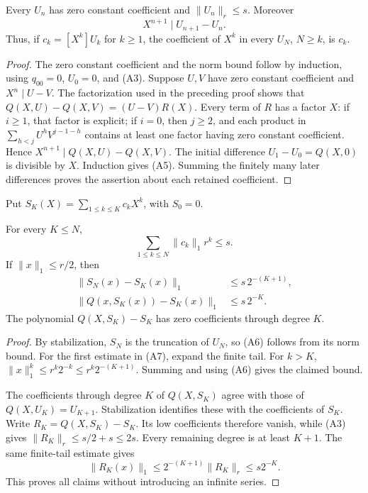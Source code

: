 \begin{lemma}
\label{lem:branch-stabilization}
Every \(U_n\) has zero constant coefficient and
\(\lVert U_n\rVert_r\leq s\). Moreover
\[
  X^{n+1}\mid U_{n+1}-U_n.
 \tag{A5}\label{eq:degree-stabilization}
\]
Thus, if \(c_k=[X^k]U_k\) for \(k\geq1\), the coefficient of
\(X^k\) in every \(U_N\), \(N\geq k\), is \(c_k\).
\end{lemma}
\begin{proof}
The zero constant coefficient and the norm bound follow by induction,
using \(q_{00}=0\), \(U_0=0\), and (A3). Suppose \(U,V\) have zero
constant coefficient and \(X^n\mid U-V\). The factorization used in
the preceding proof shows that
\(Q(X,U)-Q(X,V)=(U-V)R(X)\). Every term of \(R\) has a factor
\(X\): if \(i\geq1\), that factor is explicit; if \(i=0\), then
\(j\geq2\), and each product in
\(\sum_{h<j}U^hV^{j-1-h}\) contains at least one factor having zero
constant coefficient. Hence \(X^{n+1}\mid Q(X,U)-Q(X,V)\).
The initial difference \(U_1-U_0=Q(X,0)\) is divisible by \(X\).
Induction gives (A5). Summing the finitely many later differences
proves the assertion about each retained coefficient.
\end{proof}

Put \(S_K(X)=\sum_{1\leq k\leq K}c_kX^k\), with \(S_0=0\).

\begin{theorem}
\label{thm:finite-branch}
For every \(K\leq N\),
\[
 \sum_{1\leq k\leq N}\lVert c_k\rVert_1r^k\leq s.
 \tag{A6}\label{eq:branch-majorant}
\]
If \(\lVert x\rVert_1\leq r/2\), then
\[
 \begin{split}
 \lVert S_N(x)-S_K(x)\rVert_1&\leq s\,2^{-(K+1)},\\
 \lVert Q(x,S_K(x))-S_K(x)\rVert_1&\leq s\,2^{-K}.
 \end{split}
 \tag{A7}\label{eq:branch-tail}
\]
The polynomial \(Q(X,S_K)-S_K\) has zero coefficients through
degree \(K\).
\end{theorem}
\begin{proof}
By stabilization, \(S_N\) is the truncation of \(U_N\), so (A6)
follows from its norm bound. For the first estimate in (A7), expand the
finite tail. For \(k>K\),
\(\lVert x\rVert_1^k\leq r^k2^{-k}\leq r^k2^{-(K+1)}\).
Summing and using (A6) gives the claimed bound.

The coefficients through degree \(K\) of \(Q(X,S_K)\) agree with
those of \(Q(X,U_K)=U_{K+1}\). Stabilization identifies these with
the coefficients of \(S_K\). Write
\(R_K=Q(X,S_K)-S_K\). Its low coefficients therefore vanish, while
(A3) gives
\(\lVert R_K\rVert_r\leq s/2+s\leq2s\). Every remaining degree
is at least \(K+1\). The same finite-tail estimate gives
\[
 \lVert R_K(x)\rVert_1
 \leq2^{-(K+1)}\lVert R_K\rVert_r
 \leq s2^{-K}.
\]
This proves all claims without introducing an infinite series.
\end{proof}

